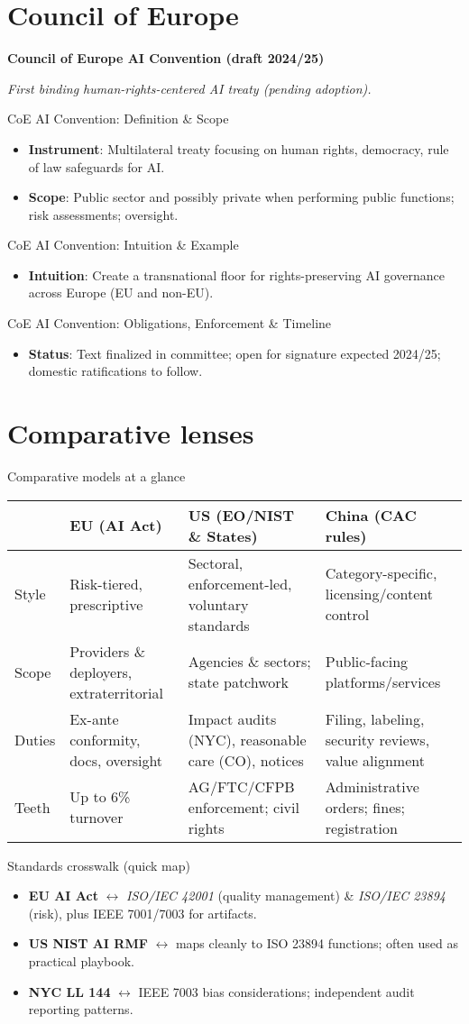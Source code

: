 \documentclass[aspectratio=169]{beamer}
\newcommand{\RegTitle}[2]{%
  \begin{frame}[plain]
    \centering
    \vfill
    {\usebeamerfont{title}\usebeamercolor[fg]{title}\LARGE \textbf{#1}\par}
    \vspace{0.4em}
    {\small \itshape #2\par}
    \vfill
  \end{frame}
}
\newcommand{\RegDef}[2]{%
  \begin{frame}{#1: Definition \& Scope}
    \begin{itemize}
      #2
    \end{itemize}
  \end{frame}
}
\newcommand{\RegIntuition}[2]{%
  \begin{frame}{#1: Intuition \& Example}
    \begin{itemize}
      #2
    \end{itemize}
  \end{frame}
}
\newcommand{\RegCompliance}[2]{%
  \begin{frame}{#1: Obligations, Enforcement \& Timeline}
    \begin{itemize}
      #2
    \end{itemize}
  \end{frame}
}
\begin{document}
\section{Council of Europe}

\RegTitle{Council of Europe AI Convention (draft 2024/25)}{First binding human-rights-centered AI treaty (pending adoption).}
\RegDef{CoE AI Convention}{%
  \item \textbf{Instrument}: Multilateral treaty focusing on human rights, democracy, rule of law safeguards for AI.
  \item \textbf{Scope}: Public sector and possibly private when performing public functions; risk assessments; oversight.
}
\RegIntuition{CoE AI Convention}{%
  \item \textbf{Intuition}: Create a transnational floor for rights-preserving AI governance across Europe (EU and non-EU).
}
\RegCompliance{CoE AI Convention}{%
  \item \textbf{Status}: Text finalized in committee; open for signature expected 2024/25; domestic ratifications to follow.
}

\section{Comparative lenses}

\begin{frame}{Comparative models at a glance}
\begin{tabularx}{\linewidth}{@{}l X X X@{}}
\toprule
 & \textbf{EU (AI Act)} & \textbf{US (EO/NIST \& States)} & \textbf{China (CAC rules)}\\
\midrule
Style & Risk-tiered, prescriptive & Sectoral, enforcement-led, voluntary standards & Category-specific, licensing/content control\\
Scope & Providers \& deployers, extraterritorial & Agencies \& sectors; state patchwork & Public-facing platforms/services\\
Duties & Ex-ante conformity, docs, oversight & Impact audits (NYC), reasonable care (CO), notices & Filing, labeling, security reviews, value alignment\\
Teeth & Up to 6\% turnover & AG/FTC/CFPB enforcement; civil rights & Administrative orders; fines; registration\\
\bottomrule
\end{tabularx}
\end{frame}

\begin{frame}{Standards crosswalk (quick map)}
\begin{itemize}
  \item \textbf{EU AI Act} $\leftrightarrow$ \emph{ISO/IEC 42001} (quality management) \& \emph{ISO/IEC 23894} (risk), plus IEEE 7001/7003 for artifacts.
  \item \textbf{US NIST AI RMF} $\leftrightarrow$ maps cleanly to ISO 23894 functions; often used as practical playbook.
  \item \textbf{NYC LL 144} $\leftrightarrow$ IEEE 7003 bias considerations; independent audit reporting patterns.
\end{itemize}
\end{frame}
\end{document}
